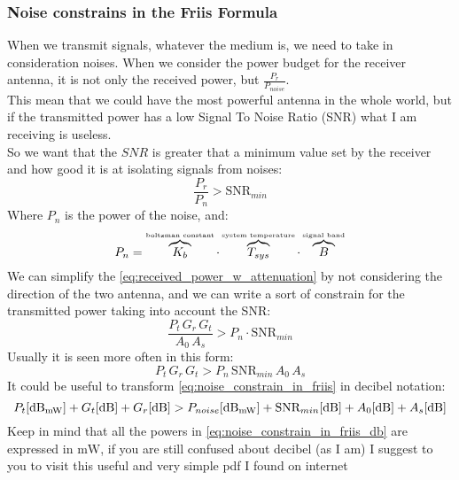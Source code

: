 \subsubsection*{Noise constrains in the Friis Formula}
When we transmit signals, whatever the medium is, we need to take in consideration noises. When we consider the power budget for the receiver antenna, it is not only the received power, but $\frac{P_r}{P_{noise}}$.\\
This mean that we could have the most powerful antenna in the whole world, but if the transmitted power has a low Signal To Noise Ratio (SNR) what I am receiving is useless.\\
So we want that the $SNR$ is greater that a minimum value set by the receiver and how good it is at isolating signals from noises:
\begin{equation}
    \frac{P_r}{P_{n}}>\text{SNR}_{min}
\end{equation}
Where $P_n$ is the power of the noise, and:
\begin{equation}
    P_n=\overbrace{K_b}^{\text{\tiny{boltzman constant}}}\cdot \overbrace{T_{sys}}^{\text{\tiny{system temperature}}}\cdot\overbrace{B}^{\text{\tiny{signal band}}}
\end{equation}
We can simplify the \cref{eq:received_power_w_attenuation} by not considering the direction of the two antenna, and we can write a sort of constrain for the transmitted power taking into account the SNR:
\begin{equation}
    \frac{P_t\,G_r\,G_t}{A_0\,A_s}>P_{n}\cdot\text{SNR}_{min}
\end{equation}
Usually it is seen more often in this form:
\begin{equation}\label{eq:noise_constrain_in_friis}
    P_t\,G_r\,G_t>P_{n} \, \text{SNR}_{min} \,A_0\,A_s
\end{equation}
It could be useful to transform \cref{eq:noise_constrain_in_friis} in decibel notation:
\begin{equation}\label{eq:noise_constrain_in_friis_db}
    P_t[\si{\deci\bel_{\milli\watt}}]+G_t[\si{\deci\bel}]+G_r[\si{\deci\bel}]>P_{noise}[\si{\deci\bel_{\milli\watt}}]+\text{SNR}_{min}[\si{\deci\bel}]+A_0[\si{\deci\bel}]+A_s[\si{\deci\bel}]
\end{equation}
Keep in mind that all the powers in \cref{eq:noise_constrain_in_friis_db} are expressed in $\si{\milli \watt}$, if you are still confused about decibel (as I am) I suggest to you to visit this useful and very simple pdf I found on internet\cite{Appunti_decibel}

